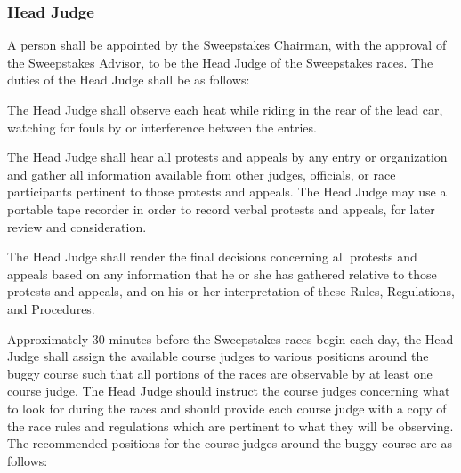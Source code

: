 \subsubsection{Head Judge}

	A person shall be appointed by the Sweepstakes Chairman, with the approval of
	the Sweepstakes Advisor, to be the Head Judge of the Sweepstakes races. The
	duties of the Head Judge shall be as follows:

	The Head Judge shall observe each heat while riding in the rear of the lead
	car, watching for fouls by or interference between the entries.

	The Head Judge shall hear all protests and appeals by any entry or organization
	and gather all information available from other judges, officials, or race
	participants pertinent to those protests and appeals. The Head Judge may use a
	portable tape recorder in order to record verbal protests and appeals, for
	later review and consideration.

	The Head Judge shall render the final decisions concerning all protests and
	appeals based on any information that he or she has gathered relative to those
	protests and appeals, and on his or her interpretation of these Rules,
	Regulations, and Procedures.

	Approximately 30 minutes before the Sweepstakes races begin each day, the Head
	Judge shall assign the available course judges to various positions around the
	buggy course such that all portions of the races are observable by at least one
	course judge. The Head Judge should instruct the course judges concerning what
	to look for during the races and should provide each course judge with a copy
	of the race rules and regulations which are pertinent to what they will be
	observing. The recommended positions for the course judges around the buggy
	course are as follows:

